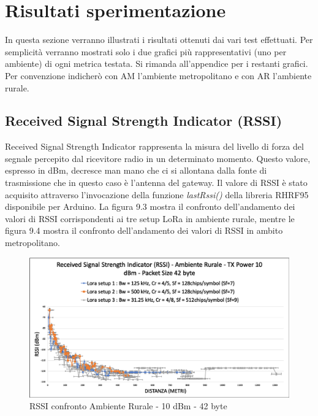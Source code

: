 \documentclass[12pt,a4paper,openright,twoside]{report}
\begin{document}
\section{Risultati sperimentazione}
In questa sezione verranno illustrati i risultati ottenuti dai vari test effettuati. Per semplicit\`a verranno mostrati solo i due grafici pi\`u rappresentativi (uno per ambiente) di ogni metrica testata. Si rimanda all'appendice per i restanti grafici. 
Per convenzione indicher\`o con AM l'ambiente metropolitano e con AR l'ambiente rurale.

\subsection{Received Signal Strength Indicator (RSSI)}
Received Signal Strength Indicator rappresenta la misura del livello di forza del segnale percepito dal ricevitore radio in un determinato momento. Questo valore, espresso in dBm, decresce man mano che ci si allontana dalla fonte di trasmissione che in questo caso \`e l'antenna del gateway. 
Il valore di RSSI \`e stato acquisito attraverso l'invocazione della funzione \textit{lastRssi()} della libreria RHRF95 disponibile per Arduino. La figura 9.3 mostra il confronto dell'andamento dei valori di RSSI corrispondenti ai tre setup LoRa in ambiente rurale, mentre le figura 9.4 mostra il confronto dell'andamento dei valori di RSSI in ambito metropolitano.

\begin{figure}[h]                      
\begin{center} 
\includegraphics[width=\textwidth]{RSSI_confronto_AR-10dBm-42byte.png}
\caption[RSSI confronto Ambiente Rurale - 10 dBm - 42 byte]{RSSI confronto Ambiente Rurale - 10 dBm - 42 byte}\label{fig:prima}
\end{center}
\end{figure}
\end{document}
